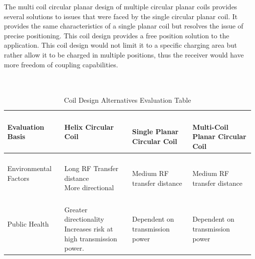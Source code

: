 \documentclass[12pt]{article}
\begin{document}
\indent
The multi coil circular planar design of multiple circular planar coils provides several solutions to issues that were faced by the single circular planar coil. It provides the same characteristics of a single planar coil but resolves the issue of precise positioning. This coil design provides a free position solution to the application. This coil design would not limit it to a specific charging area but rather allow it to be charged in multiple positions, thus the receiver would have more freedom of coupling capabilities.\cite{fsinccoils}\\
\hfill \\
\pagebreak
\hfill \\
\begin{table}[h!]
\centering
\caption{Coil Design Alternatives Evaluation Table}
\begin{tabular}{| l | l | l | l |}
\hline
\parbox{0.17\linewidth}{\centering Evaluation Basis} & \parbox{0.240\linewidth}{\centering 
Helix Circular Coil
} & \parbox{0.240\linewidth}{\centering 
\hfill \\ Single Planar Circular Coil \\
} & \parbox{0.240\linewidth}{\centering 
\hfill \\ Multi-Coil Planar Circular Coil \\
}\\
\hline
\parbox{0.17\linewidth}{\raggedleft Environmental Factors} &
\parbox{0.240\linewidth}{\hfill \\
Long RF Transfer distance\\
More directional
\\} & 
\parbox{0.240\linewidth}{\hfill \\
Medium RF transfer distance
\\} & \parbox{0.240\linewidth}{\hfill \\
Medium RF transfer distance
\\}\\ \hline
\parbox{0.17\linewidth}{\raggedleft Public Health} & 
\parbox{0.240\linewidth}{\hfill \\
Greater directionality\\
Increases risk at high transmission power.
\\} & 
\parbox{0.240\linewidth}{\hfill \\
Dependent on transmission power
\\} & \parbox{0.240\linewidth}{\hfill \\
Dependent on transmission power
\\}\\ \hline

\end{tabular}
\end{table}
\end{document}
